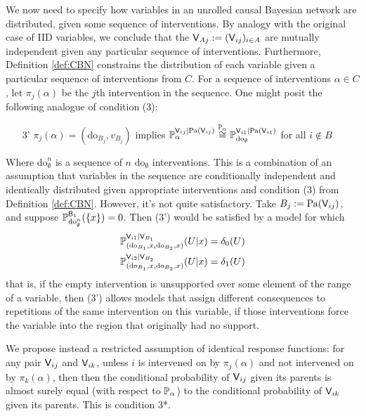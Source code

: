 We now need to specify how variables in an unrolled causal Bayesian network are distributed, given some sequence of interventions. By analogy with the original case of IID variables, we conclude that the $\mathsf{V}_{Aj}:=(\mathsf{V}_{ij})_{i\in A}$ are mutually independent given any particular sequence of interventions. Furthermore, Definition \ref{def:CBN} constrains the distribution of each variable given a particular sequence of interventions from $C$. For a sequence of interventions $\alpha\in C$, let $\pi_j(\alpha)$ be the $j$th intervention in the sequence. One might posit the following analogue of condition (3): 
\begin{itemize}
    \item [3'] $\pi_j(\alpha)=(\mathrm{do}_{B_j},v_{B_j})$ implies $\mathbb{P}_{\alpha}^{\mathsf{V}_{ij}|\mathrm{Pa}(\mathsf{V}_{ij})}\overset{\mathbb{P}_{\alpha}}{\cong}\mathbb{P}_{\mathrm{do}_{\emptyset}}^{\mathsf{V}_{i1}|\mathrm{Pa}(\mathsf{V}_{i1})}$ for all $i\not\in B$
\end{itemize}
Where $\mathrm{do}_{\emptyset}^n$ is a sequence of $n$ $\mathrm{do}_{\emptyset}$ interventions. This is a combination of an assumption that variables in the sequence are conditionally independent and identically distributed given appropriate interventions and condition (3) from Definition \ref{def:CBN}. However, it's not quite satisfactory. Take $B_j:=\mathrm{Pa}(\mathsf{V}_{ij})$, and suppose $\mathbb{P}_{\mathrm{do}_{\emptyset}^n}^{\mathsf{B}_{1}}(\{x\})=0$. Then (3') would be satisfied by a model for which
\begin{align}
    \mathbb{P}_{(\mathrm{do}_{B_1},x,\mathrm{do}_{B_2},x)}^{\mathsf{V}_{i1}|\mathsf{V}_{B_1}}(U|x) &= \delta_0(U)\\
    \mathbb{P}_{(\mathrm{do}_{B_1},x,\mathrm{do}_{B_2},x)}^{\mathsf{V}_{i2}|\mathsf{V}_{B_2}}(U|x) &= \delta_1(U)
\end{align}
that is, if the empty intervention is unsupported over some element of the range of a variable, then (3') allows models that assign different consequences to repetitions of the same intervention on this variable, if those interventions force the variable into the region that originally had no support.

We propose instead a restricted assumption of identical response functions: for any pair $\mathsf{V}_{ij}$ and $\mathsf{V}_{ik}$, unless $i$ is intervened on by $\pi_j(\alpha)$ and not intervened on by $\pi_{k}(\alpha)$, then then the conditional probability of $\mathsf{V}_{ij}$ given its parents is almost surely equal (with respect to $\mathbb{P}_\alpha$) to the conditional probability of $\mathsf{V}_{ik}$ given its parents. This is condition 3*.

